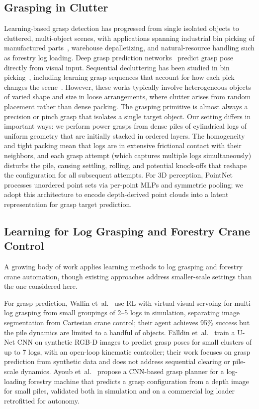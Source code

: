 \documentclass[conference]{IEEEtran}
\begin{document}
\subsection{Grasping in Clutter}
Learning-based grasp detection has progressed from single isolated objects to cluttered, multi-object scenes, with applications spanning industrial bin picking of manufactured parts~\cite{mahler2017dexnet}, warehouse depalletizing, and natural-resource handling such as forestry log loading.
Deep grasp prediction networks~\cite{morrison2018closing, kumra2017robotic} predict grasp pose directly from visual input.
Sequential decluttering has been studied in bin picking~\cite{mahler2017dexnet, zeng2018learning}, including learning grasp sequences that account for how each pick changes the scene~\cite{mahler2017sequential}.
However, these works typically involve heterogeneous objects of varied shape and size in loose arrangements, where clutter arises from random placement rather than dense packing.
The grasping primitive is almost always a precision or pinch grasp that isolates a single target object.
Our setting differs in important ways: we perform power grasps from dense piles of cylindrical logs of uniform geometry that are initially stacked in ordered layers.
The homogeneity and tight packing mean that logs are in extensive frictional contact with their neighbors, and each grasp attempt (which captures multiple logs simultaneously) disturbs the pile, causing settling, rolling, and potential knock-offs that reshape the configuration for all subsequent attempts.
For 3D perception, PointNet~\cite{qi2017pointnet} processes unordered point sets via per-point MLPs and symmetric pooling; we adopt this architecture to encode depth-derived point clouds into a latent representation for grasp target prediction.

\subsection{Learning for Log Grasping and Forestry Crane Control}
A growing body of work applies learning methods to log grasping and forestry crane automation, though existing approaches address smaller-scale settings than the one considered here.

For grasp prediction, Wallin et~al.~\cite{wallin2024multilog} use RL with virtual visual servoing for multi-log grasping from small groupings of 2--5 logs in simulation, separating image segmentation from Cartesian crane control; their agent achieves 95\% success but the pile dynamics are limited to a handful of objects.
F{\"a}lldin et~al.~\cite{falldin2025synthesizing} train a U-Net CNN on synthetic RGB-D images to predict grasp poses for small clusters of up to 7 logs, with an open-loop kinematic controller; their work focuses on grasp prediction from synthetic data and does not address sequential clearing or pile-scale dynamics.
Ayoub et~al.~\cite{ayoub2023grasp} propose a CNN-based grasp planner for a log-loading forestry machine that predicts a grasp configuration from a depth image for small piles, validated both in simulation and on a commercial log loader retrofitted for autonomy.
\end{document}
